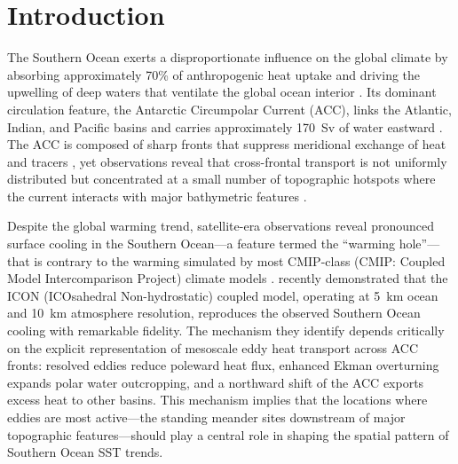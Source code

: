 \documentclass[draft]{agujournal2019}
\begin{document}
\section{Introduction}

The Southern Ocean exerts a disproportionate influence on the global climate by absorbing approximately 70\% of anthropogenic heat uptake \cite{frolicher2015dominance} and driving the upwelling of deep waters that ventilate the global ocean interior \cite{marshall2012closure,morrison2015upwelling}.
Its dominant circulation feature, the Antarctic Circumpolar Current (ACC), links the Atlantic, Indian, and Pacific basins and carries approximately 170~Sv of water eastward \cite{donohue2016mean}.
The ACC is composed of sharp fronts that suppress meridional exchange of heat and tracers \cite{naveira2011eddy, chapman2017isopycnal}, yet observations reveal that cross-frontal transport is not uniformly distributed but concentrated at a small number of topographic hotspots where the current interacts with major bathymetric features \cite{thompson2012jets, foppert2017eddy}.


Despite the global warming trend, satellite-era observations reveal pronounced surface cooling in the Southern Ocean---a feature termed the ``warming hole''---that is contrary to the warming simulated by most CMIP-class (CMIP: Coupled Model Intercomparison Project) climate models \cite{wills2022systematic, kang2026km}.
 recently demonstrated that the ICON (ICOsahedral Non-hydrostatic) coupled model, operating at 5~km ocean and 10~km atmosphere resolution, reproduces the observed Southern Ocean cooling with remarkable fidelity.
The mechanism they identify depends critically on the explicit representation of mesoscale eddy heat transport across ACC fronts: resolved eddies reduce poleward heat flux, enhanced Ekman overturning expands polar water outcropping, and a northward shift of the ACC exports excess heat to other basins.
This mechanism implies that the locations where eddies are most active---the standing meander sites downstream of major topographic features---should play a central role in shaping the spatial pattern of Southern Ocean SST trends.
\end{document}
